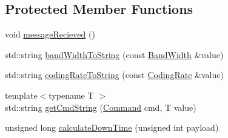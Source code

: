 \subsection*{Protected Member Functions}
\begin{DoxyCompactItemize}
\item 
void \hyperlink{classo_cpt_1_1_lo_ra_a606eeaec7fb73b483f958005444246b4}{message\+Recieved} ()
\item 
std\+::string \hyperlink{classo_cpt_1_1_lo_ra_a225b527e6f098ae6b481ed56edb0744c}{band\+Width\+To\+String} (const \hyperlink{classo_cpt_1_1_lo_ra_abb27d22a584625eea0339906152c031d}{Band\+Width} \&value)
\item 
std\+::string \hyperlink{classo_cpt_1_1_lo_ra_a404a9de4e173c0f17c7ca6a915a7fa4b}{coding\+Rate\+To\+String} (const \hyperlink{classo_cpt_1_1_lo_ra_a9bbdbc3b6fefdabd52bbb3ebbebcee7a}{Coding\+Rate} \&value)
\item 
{\footnotesize template$<$typename T $>$ }\\std\+::string \hyperlink{classo_cpt_1_1_lo_ra_a216a2381e53df6e08e9414ac36d31e6f}{get\+Cmd\+String} (\hyperlink{classo_cpt_1_1_lo_ra_a62484769efc348d26e38ff876b8c7840}{Command} cmd, T value)
\item 
unsigned long \hyperlink{classo_cpt_1_1_lo_ra_a36aa990d9ce4981d60ef637cc26d0926}{calculate\+Down\+Time} (unsigned int payload)
\end{DoxyCompactItemize}
